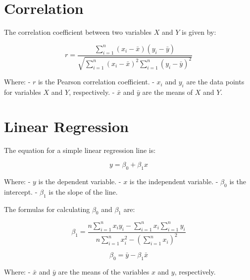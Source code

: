 \documentclass{article}
\begin{document}
\section{Correlation}
The correlation coefficient between two variables \(X\) and \(Y\) is given by:

\[
r = \frac{\sum_{i=1}^{n} (x_i - \bar{x})(y_i - \bar{y})}{\sqrt{\sum_{i=1}^{n} (x_i - \bar{x})^2 \sum_{i=1}^{n} (y_i - \bar{y})^2}}
\]

Where:
- \(r\) is the Pearson correlation coefficient.
- \(x_i\) and \(y_i\) are the data points for variables \(X\) and \(Y\), respectively.
- \( \bar{x} \) and \( \bar{y} \) are the means of \(X\) and \(Y\).

\section{Linear Regression}
The equation for a simple linear regression line is:

\[
y = \beta_0 + \beta_1 x
\]

Where:
- \(y\) is the dependent variable.
- \(x\) is the independent variable.
- \(\beta_0\) is the intercept.
- \(\beta_1\) is the slope of the line.

The formulas for calculating \(\beta_0\) and \(\beta_1\) are:

\[
\beta_1 = \frac{n \sum_{i=1}^{n} x_i y_i - \sum_{i=1}^{n} x_i \sum_{i=1}^{n} y_i}{n \sum_{i=1}^{n} x_i^2 - \left(\sum_{i=1}^{n} x_i\right)^2}
\]

\[
\beta_0 = \bar{y} - \beta_1 \bar{x}
\]

Where:
- \( \bar{x} \) and \( \bar{y} \) are the means of the variables \(x\) and \(y\), respectively.
\end{document}
